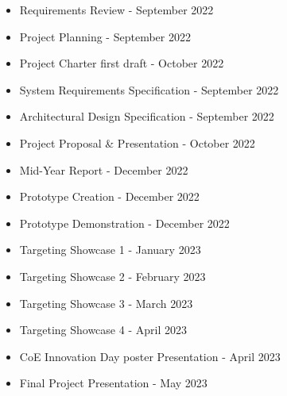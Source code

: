 
\begin{itemize}
    \item Requirements Review - September 2022
    \item Project Planning - September 2022
    \item Project Charter first draft - October 2022
    \item System Requirements Specification - September 2022
    \item Architectural Design Specification - September 2022
    \item Project Proposal \& Presentation - October 2022
    \item Mid-Year Report - December 2022
    \item Prototype Creation - December 2022
    \item Prototype Demonstration - December 2022
    \item Targeting Showcase 1 - January 2023
    \item Targeting Showcase 2 - February 2023
    \item Targeting Showcase 3 - March 2023
    \item Targeting Showcase 4 - April 2023
    \item CoE Innovation Day poster Presentation - April 2023
    \item Final Project Presentation - May 2023
\end{itemize}
